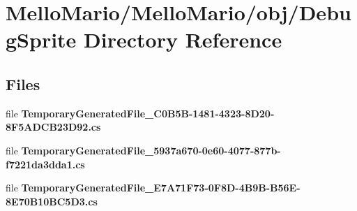 \section{Mello\+Mario/\+Mello\+Mario/obj/\+Debug\+Sprite Directory Reference}
\label{dir_b0b3a0547f208f88edba62df1c7ab618}
\subsection*{Files}
\begin{DoxyCompactItemize}
\item 
file \textbf{ Temporary\+Generated\+File\+\_\+C0\+B5\+B-\/1481-\/4323-\/8\+D20-\/8\+F5\+A\+D\+C\+B23\+D92.\+cs}
\item 
file \textbf{ Temporary\+Generated\+File\+\_\+5937a670-\/0e60-\/4077-\/877b-\/f7221da3dda1.\+cs}
\item 
file \textbf{ Temporary\+Generated\+File\+\_\+\+E7\+A71\+F73-\/0\+F8\+D-\/4\+B9\+B-\/\+B56\+E-\/8\+E70\+B10\+B\+C5\+D3.\+cs}
\end{DoxyCompactItemize}
